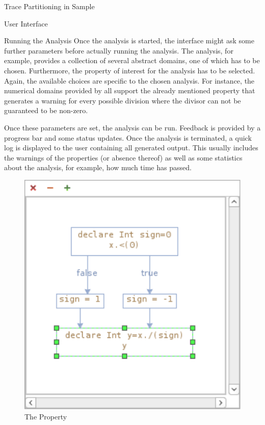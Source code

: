 \begin{chapter}{Trace Partitioning in Sample}
\begin{section}{User Interface}

		\begin{subsection}{Running the Analysis}
			Once the analysis is started, the interface might ask some further parameters before actually running the analysis. The \apron analysis, for example, provides a collection of several abstract domains, one of which has to be chosen. Furthermore, the property of interest for the analysis has to be selected. Again, the available choices are specific to the chosen analysis. For instance, the numerical domains provided by \apron all support the already mentioned  property that generates a warning for every possible division where the divisor can not be guaranteed to be non-zero.

			Once these parameters are set, the analysis can be run. Feedback is provided by a progress bar and some status updates. Once the analysis is terminated, a quick log is displayed to the user containing all generated output. This usually includes the warnings of the properties (or absence thereof) as well as some statistics about the analysis, for example, how much time has passed.

			\begin{figure}
				\centering
				\includegraphics[scale=0.7]{Images/ShowGraph.pdf}
				\caption{The  Property}
				\label{figure:ShowGraph}
			\end{figure}


\end{subsection}
\end{section}
\end{chapter}
